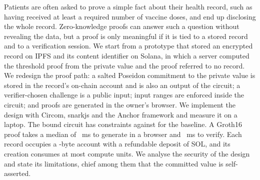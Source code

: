 Patients are often asked to prove a simple fact about their health record,
such as having received at least a required number of vaccine doses, and
end up disclosing the whole record. Zero-knowledge proofs can answer such a
question without revealing the data, but a proof is only meaningful if it is
tied to a stored record and to a verification session. We start from a
prototype that stored an encrypted record on IPFS and its content identifier
on Solana, in which a server computed the threshold proof from the private
value and the proof referred to no record. We redesign the proof path: a
salted Poseidon commitment to the private value is stored in the record's
on-chain account and is also an output of the circuit; a verifier-chosen
challenge is a public input; input ranges are enforced inside the circuit;
and proofs are generated in the owner's browser. We implement the design
with Circom, snarkjs and the Anchor framework and measure it on a laptop.
The bound circuit has \NewConstraints{} constraints against
\OldConstraints{} for the baseline. A Groth16 proof takes a median of
\BrowserProveMs~ms to generate in a browser and \NewVerifyMs~ms to verify.
Each record occupies a \AccountBytes-byte account with a refundable deposit
of \RentSol{} SOL, and its creation consumes at most \CuMax{} compute units.
We analyse the security of the design and state its limitations, chief among
them that the committed value is self-asserted.
